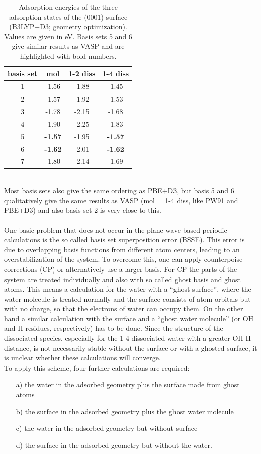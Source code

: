 \documentclass[11pt,DIV=13,BCOR=5mm,a4paper,headinclude]{scrbook}
\begin{document}
 \begin{table}[!h]
  \centering
   \caption{Adsorption energies of the three adsorption states of the (0001) surface (B3LYP+D3; geometry optimization).
Values are given in eV.
Basis sets 5 and 6 give similar results as VASP and are highlighted with bold numbers.}
  \begin{tabular}{c|ccc}
  \toprule
  basis set & mol & 1-2 diss & 1-4 diss \\\midrule
  1 &-1.56 &-1.88 &-1.45 \\
  2 &-1.57 &-1.92 &-1.53 \\
  3 &-1.78 &-2.15 &-1.68 \\
  4 &-1.90 &-2.25 &-1.83 \\
  5 &\textbf{-1.57} &-1.95 &\textbf{-1.57} \\
  6 &\textbf{-1.62} &-2.01 &\textbf{-1.62} \\
  7 &-1.80 &-2.14 &-1.69 \\\bottomrule
  \end{tabular}
  \label{tab:basisset-results-B3LYP+D3}
\end{table}
\\
Most basis sets also give the same ordering as PBE+D3, but basis 5 and 6 qualitatively give the same results as VASP (mol = 1-4 diss, like PW91 and PBE+D3) and also basis set 2 is very close to this.
\\
\\
One basic problem that does not occur in the plane wave based periodic calculations is the so called basis set superposition error (BSSE).
This error is due to overlapping basis functions from different atom centers, leading to an overstabilization of the system.
To overcome this, one can apply counterpoise corrections (CP) or alternatively use a larger basis.
For CP the parts of the system are treated individually and also with so called ghost basis and ghost atoms.
This means a calculation for the water with a ``ghost surface'', where the water molecule is treated normally and the surface consists of atom orbitals but with no charge, so that the electrons of water can occupy them.
On the other hand a similar calculation with the surface and a ``ghost water molecule'' (or OH and H residues, respectively) has to be done.
Since the structure of the dissociated species, especially for the 1-4 dissociated water with a greater OH-H distance, is not necessarily stable without the surface or with a ghosted surface, it is unclear whether these calculations will converge.
\\
To apply this scheme, four further calculations are required:
\begin{itemize}
 \item[a)] the water in the adsorbed geometry plus the surface made from ghost atoms
 \item[b)] the surface in the adsorbed geometry plus the ghost water molecule
 \item[c)] the water in the adsorbed geometry but without surface
 \item[d)] the surface in the adsorbed geometry but without the water.
\end{itemize}
\end{document}
